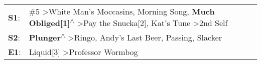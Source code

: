 \begin{supertabular}{p{0.03\textwidth}p{0.92\textwidth}}
 \textbf{S1}:  &  \#5\textsuperscript{} \textgreater \enspace White Man's Moccasins\textsuperscript{}, \enspace Morning Song\textsuperscript{}, \enspace \textbf{Much Obliged[1]\textsuperscript{$\wedge$}} \textgreater \enspace Pay the Snucka[2]\textsuperscript{}, \enspace Kat's Tune\textsuperscript{} \textgreater \enspace 2nd Self\textsuperscript{}  \enspace  \\
 \textbf{S2}:  &                                                                                                                                \textbf{Plunger\textsuperscript{$\wedge$}} \textgreater \enspace Ringo\textsuperscript{}, \enspace Andy's Last Beer\textsuperscript{}, \enspace Passing\textsuperscript{}, \enspace Slacker\textsuperscript{}  \enspace  \\
 \textbf{E1}:  &                                                                                                                                                                                                                                                        Liquid[3]\textsuperscript{} \textgreater \enspace Professor Wormbog\textsuperscript{}  \enspace  \\
\end{supertabular}
